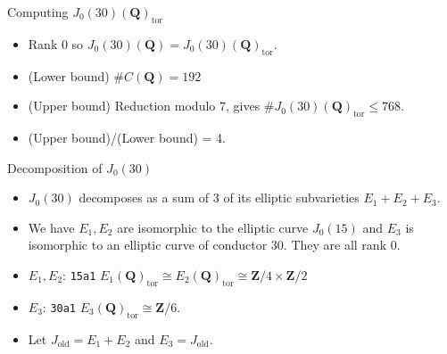 \documentclass{beamer}
\newcommand{\QQ}{\mathbf{Q}}
\newcommand{\ZZ}{\mathbf{Z}}
\newcommand{\FF}{\mathbf{F}}
\renewcommand{\ZZ}{\mathbf{Z}}
\newcommand{\tor}{\mathrm{tor}}
\newcommand{\old}{\mathrm{old}}
\newcommand{\Frob}{\mathrm{Frob}}
\newcommand{\p}{\mathfrak{p}}
\begin{document}


\begin{frame}{Computing $J_0(30)(\QQ)_\tor$}
    \begin{itemize}
        \item
            Rank 0 so $J_0(30)(\QQ)=J_0(30)(\QQ)_\tor$.
        \item
            (Lower bound) $\#C(\QQ)=192$
        \item
            (Upper bound) Reduction modulo $7$, gives $\# J_0(30)(\QQ)_\tor\leq
            768$.
        \item
            (Upper bound)/(Lower bound) = 4.
    \end{itemize}
\end{frame}

\begin{frame}{Decomposition of $J_0(30)$}
    \begin{itemize}
        \item
            $J_0(30)$ decomposes as a sum of 3 of its elliptic subvarieties
            $E_1+E_2+E_3$.
            \pause
        \item
            We have $E_1, E_2$ are isomorphic to the elliptic curve $J_0(15)$
            and $E_3$ is isomorphic to an elliptic curve of conductor 30. They
            are all rank 0.
            \pause
        \item
            $E_1, E_2$: \texttt{15a1} $E_1(\QQ)_\tor \cong E_2(\QQ)_\tor \cong
            \ZZ/4\times \ZZ/2$
            \pause
        \item
            $E_3$: \texttt{30a1} $E_3(\QQ)_\tor \cong \ZZ/6$.
            \pause
        \item
            Let $J_\old=E_1+E_2$ and $E_3=J_\old$.
    \end{itemize}
\end{frame}
\end{document}
